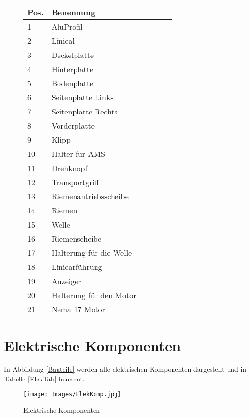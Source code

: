 \begin{figure}[htp]
	\begin{center}
		\fontsize{8}{10}\selectfont
		\begin{tabularx}{\textwidth}{|p{0.4cm}|X|X|X|X|X|} 
			\hline 
			\textbf{Pos.} &  \textbf{Benennung} \\ \hline
			1 & AluProfil   \\ \hline
			2 & Linieal   \\ \hline
			3 & Deckelplatte   \\ \hline
			4 & Hinterplatte   \\ \hline
			5 & Bodenplatte   \\ \hline
			6 & Seitenplatte Links \\ \hline
			7 & Seitenplatte Rechts  \\ \hline
			8 & Vorderplatte  \\ \hline
			9 & Klipp  \\ \hline
			10 & Halter für AMS  \\ \hline
			11 & Drehknopf  \\ \hline
			12 & Transportgriff  \\ \hline
			13 & Riemenantriebsscheibe  \\ \hline
			14 & Riemen  \\ \hline
			15 & Welle  \\ \hline
			16 & Riemenscheibe  \\ \hline
			17 & Halterung für die Welle  \\ \hline
			18 & Liniearführung  \\ \hline
			19 & Anzeiger  \\ \hline
			20 & Halterung für den Motor  \\ \hline
			21 & Nema 17 Motor  \\ \hline		
				
		\end{tabularx}
			\label{BauTab}
	\end{center}
\end{figure}


\section{Elektrische Komponenten}

In Abbildung \ref{Bauteile} werden alle elektrischen Komponenten dargestellt und in Tabelle \ref{ElekTab} benannt.

\begin{figure}[H]
	\begin{center}
		\texttt{[image: Images/ElekKomp.jpg]}
		\caption{Elektrische Komponenten} \label{ElekKomb}
	\end{center}
\end{figure}

